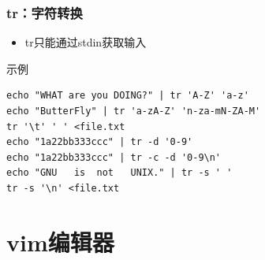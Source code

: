 \documentclass[xcolor=svgnames,presentation]{beamer}
\begin{document}
\begin{frame}[fragile]
\frametitle{tr：字符转换}
\label{sec-3-1-12}
\begin{itemize}

\item tr只能通过stdin获取输入
\label{sec-3-1-12-1}%
\end{itemize} %
\begin{exampleblock}{示例}
\label{sec-3-1-12-2}


\begin{verbatim}
echo "WHAT are you DOING?" | tr 'A-Z' 'a-z'
echo "ButterFly" | tr 'a-zA-Z' 'n-za-mN-ZA-M'
tr '\t' ' ' <file.txt
echo "1a22bb333ccc" | tr -d '0-9'
echo "1a22bb333ccc" | tr -c -d '0-9\n'
echo "GNU   is  not   UNIX." | tr -s ' '
tr -s '\n' <file.txt
\end{verbatim}
\end{exampleblock}
\end{frame}
\section{vim编辑器}
\label{sec-4}
\end{document}
